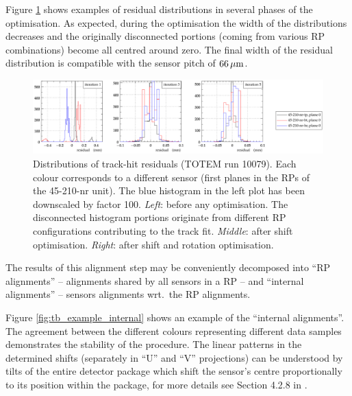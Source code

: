 \documentclass[TOTEM]{cern/cernphprep}
\def\un#1{\,{\rm #1}}
\begin{document}
Figure \ref{fig:tb_residuals} shows examples of residual distributions in several phases of the optimisation. As expected, during the optimisation the width of the distributions decreases and the originally disconnected portions (coming from various RP combinations) become all centred around zero. The final width of the residual distribution is compatible with the sensor pitch of $66\un{\mu m}$.


\begin{figure}[h!]
\begin{center}
\includegraphics[width=\hsize]{fig/calibration_fill/residuals.pdf}
\caption{%
Distributions of track-hit residuals (TOTEM run 10079). Each colour corresponds to a different sensor (first planes in the RPs of the 45-210-nr unit). The blue histogram in the left plot has been downscaled by factor 100. {\it Left}: before any optimisation. The disconnected histogram portions originate from different RP configurations contributing to the track fit. {\it Middle}: after shift optimisation. {\it Right}: after shift and rotation optimisation.
}
\label{fig:tb_residuals}
\end{center}
\end{figure}

The results of this alignment step may be conveniently decomposed into ``RP alignments'' -- alignments shared by all sensors in a RP -- and ``internal alignments'' -- sensors alignments wrt.~the RP alignments.

Figure \ref{fig:tb_example_internal} shows an example of the ``internal alignments''. The agreement between the different colours representing different data samples demonstrates the stability of the procedure. The linear patterns in the determined shifts (separately in ``U'' and ``V'' projections) can be understood by tilts of the entire detector package which shift the sensor's centre proportionally to its position within the package, for more details see Section 4.2.8 in \cite{jan_thesis}.
\end{document}
